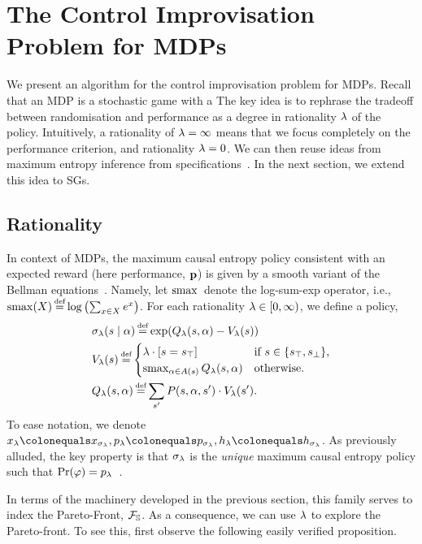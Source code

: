 \section{The Control Improvisation Problem for MDPs}
\label{sec:mdps}

We present an algorithm for the control improvisation problem for
MDPs. Recall that an MDP is a stochastic game with a 
The key idea is to rephrase the tradeoff between
randomisation and performance as a degree in rationality $\lambda$ of the
policy. Intuitively, a rationality of $\lambda = \infty$ means that we
focus completely on the performance criterion, and rationality $\lambda =
0$. We can then reuse ideas from maximum entropy inference from
specifications~\cite{DBLP:conf/cav/Vazquez-Chanlatte20}.  In the next
section, we extend this idea to SGs.

\subsection{Rationality}

\noindent
In context of MDPs, the maximum causal entropy policy consistent with
an expected reward (here performance, $\mathbf{p}$) is given by a
smooth variant of the Bellman equations~\cite{mceThesis}. Namely, let
$\operatorname*{\mathrm{smax}}{}$ denote the log-sum-exp operator, i.e., $\smoothmax(X)
\eqdef \log \left( \sum_{x\in X} e^x \right)$. For each rationality
$\lambda \in [0, \infty)$, we define a policy,
 \begin{align}
   &\sched_\rat(s\mid \act) \eqdef \exp( Q_\rat(s,\act) - V_\rat(s))  \\
   & V_\rat(s) \eqdef  \begin{cases}
     \lambda  \cdot \indicator{s = \target} & \text{if }s \in \{ \target, \sink \},\\
     \smoothmax_{\act \in \EnAct(s)}{  Q_\rat(s,\act) } & \text{otherwise.}
   \end{cases}\\ 
	& Q_\rat(s, \act) \eqdef \sum_{s'} P(s,\act,s') \cdot V_\rat(s').
 \end{align}
To ease notation, we denote $x_\rat \colonequals x_{\sched_\rat},
\scp_\rat \colonequals \scp_{\sched_\rat}, \rndp_\rat \colonequals
\rndp_{\sched_\rat}$. As previously alluded, the key property
is that $\sigma_\lambda$ is the \emph{unique} maximum causal entropy policy
such that $\Pr(\varphi) = p_\lambda$~\cite{DBLP:conf/cav/Vazquez-Chanlatte20}.

In terms of the machinery developed in the previous section, this
family serves to index the Pareto-Front, $\mathcal{F}_{\mathbb{S}}$.  As a
consequence, we can use $\lambda$ to explore the Pareto-front.  To see
this, first observe the following easily verified proposition.

